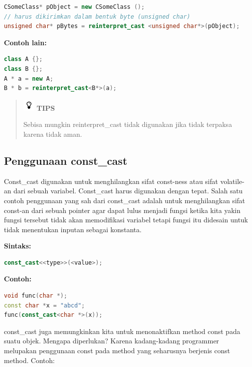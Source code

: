 \begin{lstlisting}[language=c++, numbers=none]
CSomeClass* pObject = new CSomeClass ();
// harus dikirimkan dalam bentuk byte (unsigned char)
unsigned char* pBytes = reinterpret_cast <unsigned char*>(pObject);
\end{lstlisting}

\textbf{Contoh lain:}

\begin{lstlisting}[language=c++, numbers=none]
class A {};
class B {};
A * a = new A;
B * b = reinterpret_cast<B*>(a);
\end{lstlisting}

\begin{quotation}
\includegraphics{../manuscript/images/tips.png} \textbf{TIPS} 

Sebisa
mungkin reinterpret\_cast tidak digunakan jika tidak terpaksa karena
tidak aman.
\end{quotation}


\subsection{Penggunaan const\_cast}\label{penggunaan-constux5fcast}

Const\_cast digunakan untuk menghilangkan sifat const-ness atau sifat
volatile-an dari sebuah variabel. Const\_cast harus digunakan dengan
tepat. Salah satu contoh penggunaan yang sah dari const\_cast adalah
untuk menghilangkan sifat const-an dari sebuah pointer agar dapat lulus
menjadi fungsi ketika kita yakin fungsi tersebut tidak akan memodifikasi
variabel tetapi fungsi itu didesain untuk tidak menentukan inputan
sebagai konstanta.

\textbf{Sintaks:}

\begin{lstlisting}[language=c++, numbers=none]
const_cast<<type>>(<value>);
\end{lstlisting}

\textbf{Contoh:}

\begin{lstlisting}[language=c++, numbers=none]
void func(char *);
const char *x = "abcd";
func(const_cast<char *>(x));
\end{lstlisting}

const\_cast juga memungkinkan kita untuk menonaktifkan method const pada
suatu objek. Mengapa diperlukan? Karena kadang-kadang programmer
melupakan penggunaan const pada method yang seharusnya berjenis const
method. Contoh:

